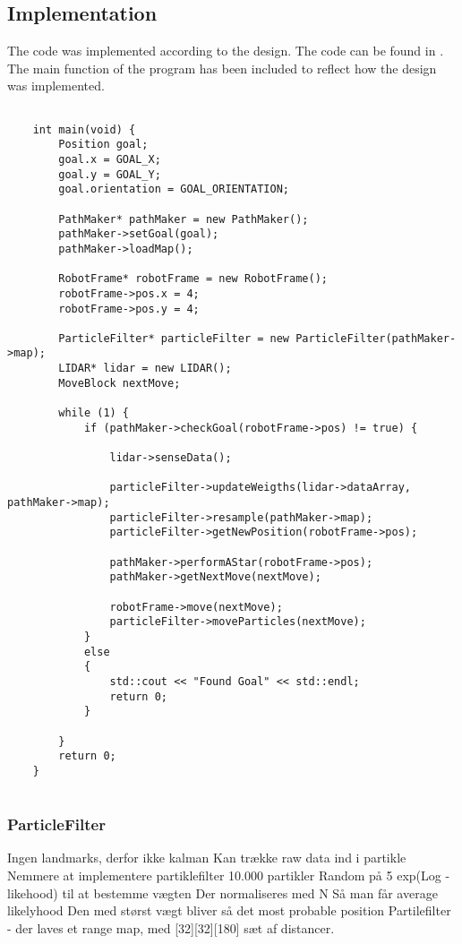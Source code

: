 \documentclass[Main]{subfiles}
\begin{document}
	
	\subsection{Implementation} %
	\label{sub:software_implementation}
	
	The code was implemented according to the design. 
	The code can be found in .
	The main function of the program has been included to reflect how the design was implemented.
	
	\begin{lstlisting}[caption=Main Function of Progam, style=Code-C++, label=lst:main_code]
	
	int main(void) {
		Position goal;
		goal.x = GOAL_X;
		goal.y = GOAL_Y;
		goal.orientation = GOAL_ORIENTATION;
	
		PathMaker* pathMaker = new PathMaker();
		pathMaker->setGoal(goal);
		pathMaker->loadMap();
	
		RobotFrame* robotFrame = new RobotFrame();
		robotFrame->pos.x = 4;
		robotFrame->pos.y = 4;
	
		ParticleFilter* particleFilter = new ParticleFilter(pathMaker->map);
		LIDAR* lidar = new LIDAR();
		MoveBlock nextMove;
	
		while (1) {
			if (pathMaker->checkGoal(robotFrame->pos) != true) {
				
				lidar->senseData();
				
				particleFilter->updateWeigths(lidar->dataArray, pathMaker->map);
				particleFilter->resample(pathMaker->map);
				particleFilter->getNewPosition(robotFrame->pos);
				
				pathMaker->performAStar(robotFrame->pos);
				pathMaker->getNextMove(nextMove);
				
				robotFrame->move(nextMove);
				particleFilter->moveParticles(nextMove);
			}
			else
			{
				std::cout << "Found Goal" << std::endl;
				return 0;
			}
	
		}
		return 0;
	}
	
	\end{lstlisting}

	\subsubsection{ParticleFilter} %
	\label{subsub:software_particlefilter}
	Ingen landmarks, derfor ikke kalman
	Kan trække raw data ind i partikle
	Nemmere at implementere partiklefilter
	10.000 partikler
	Random på 5%
	exp(Log - likehood) til at bestemme vægten
	Der normaliseres med N
	Så man får average likelyhood
	Den med størst vægt bliver så det most probable position
	Partilefilter - der laves et range map, med [32][32][180] sæt af distancer.
	
\end{document}
